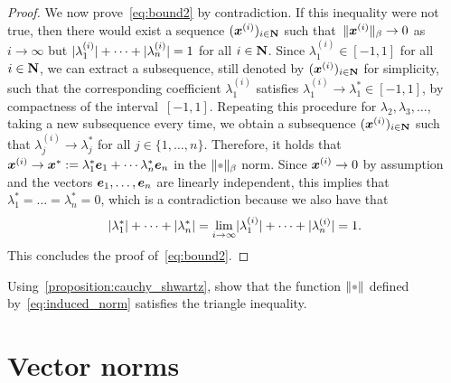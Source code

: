 \begin{proof}
    We now prove~\eqref{eq:bound2} by contradiction.
    If this inequality were not true,
    then there would exist a sequence $(\mathbf{\boldsymbol{x}}^{(i)})_{i \in \mathbf N}$ such
    that~$\lVert\mathbf{\boldsymbol{x}}^{(i)}\rVert_{\beta} \to 0$ as $i \to \infty$ but $\lvert\lambda_1^{(i)}\rvert + \dotsb + \lvert\lambda_n^{(i)}\rvert = 1$ for all $i \in \mathbf N$.
    Since $\lambda_1^{(i)} \in [-1, 1]$ for all $i \in \mathbf N$,
    we can extract a subsequence, still denoted by $(\mathbf{\boldsymbol{x}}^{(i)})_{i \in \mathbf N}$ for simplicity,
    such that the corresponding coefficient $\lambda_1^{(i)}$ satisfies $\lambda_1^{(i)} \to \lambda_1^* \in [-1, 1]$,
    by compactness of the interval~$[-1, 1]$.
    Repeating this procedure for $\lambda_2, \lambda_3, \dots$,
    taking a new subsequence every time,
    we obtain a subsequence $(\mathbf{\boldsymbol{x}}^{(i)})_{i \in \mathbf N}$ such that $\lambda^{(i)}_j \to \lambda_j^*$ for all $j \in \{1, \dotsc, n\}$.
    Therefore, it holds that $\mathbf{\boldsymbol{x}}^{(i)} \to \mathbf{\boldsymbol{x}}^* := \lambda_1^* \mathbf{\boldsymbol{e}}_1 + \dotsb \lambda_n^* \mathbf{\boldsymbol{e}}_n$ in the $\norm{\placeholder}_{\beta}$ norm.
    Since $\mathbf{\boldsymbol{x}}^{(i)} \to 0$ by assumption and the vectors $\mathbf{\boldsymbol{e}}_1, \dotsc, \mathbf{\boldsymbol{e}}_n$ are linearly independent,
    this implies that $\lambda_1^* = \dots = \lambda_n^* = 0$,
    which is a contradiction because we also have that
    \[
        \lvert\lambda_1^*\rvert + \dotsb + \lvert\lambda_n^*\rvert = \lim_{i \to \infty} \lvert\lambda_1^{(i)}\rvert + \dotsb + \lvert\lambda_n^{(i)}\rvert = 1.
    \]
    This concludes the proof of~\eqref{eq:bound2}.
\end{proof}

\begin{exercise}
    Using~\cref{proposition:cauchy_shwartz},
    show that the function $\norm{\placeholder}$ defined by~\eqref{eq:induced_norm} satisfies the triangle inequality.
\end{exercise}

\section{Vector norms}%
\label{sub:vector_norms}

